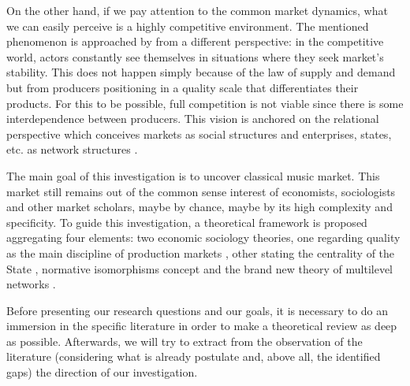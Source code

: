 \documentclass[a4paper, 12pt, openright, oneside, german, french, brazil, english]{abntex2}
\begin{document}
	On the other hand, if we pay attention to the common market dynamics, what we can easily perceive is a highly competitive environment. The mentioned phenomenon is approached by  from a different perspective: in the competitive world, actors constantly see themselves in situations where they seek market's stability. This does not happen simply because of the law of supply and demand but from producers positioning in a quality scale that differentiates their products. For this to be possible, full competition is not viable since there is some interdependence between producers. This vision is anchored on the relational perspective which conceives markets as social structures and enterprises, states, etc. as network structures \cite{white2008,white2002markets,lazega2014redes}.


	
	The main goal of this investigation is to uncover classical music market. This market still remains out of the common sense interest of economists, sociologists and other market scholars, maybe by chance, maybe by its high complexity and specificity. To guide this investigation, a theoretical framework is proposed aggregating four elements: two economic sociology theories, one regarding quality as the main discipline of production markets \cite{white2002markets}, other stating the centrality of the State \cite{fligstein2002architecture}, normative isomorphisms concept \cite{dimaggio1983iron} and the brand new theory of multilevel networks \cite{lazega2016multilevel}.
	
	Before presenting our research questions and our goals, it is necessary to do an immersion in the specific literature in order to make a theoretical review as deep as possible. Afterwards, we will try to extract from the observation of the literature (considering what is already postulate and, above all, the identified gaps) the direction of our investigation.
\end{document}
